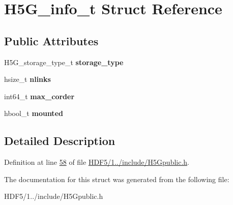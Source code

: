 \hypertarget{struct_h5_g__info__t}{}\section{H5\+G\+\_\+info\+\_\+t Struct Reference}
\label{struct_h5_g__info__t}
\subsection*{Public Attributes}
\begin{DoxyCompactItemize}
\item 
\mbox{\label{struct_h5_g__info__t_a1e48d909c66c0da1e3ce9a9c5885d88e}} 
H5\+G\+\_\+storage\+\_\+type\+\_\+t {\bfseries storage\+\_\+type}
\item 
\mbox{\label{struct_h5_g__info__t_a59f61c76e38e6fec7d0aa7eec27d1c12}} 
hsize\+\_\+t {\bfseries nlinks}
\item 
\mbox{\label{struct_h5_g__info__t_a868324af84add9487ea453082f1bfdbb}} 
int64\+\_\+t {\bfseries max\+\_\+corder}
\item 
\mbox{\label{struct_h5_g__info__t_a0dd8dd06b20dc3af0a481d725feaf4fe}} 
hbool\+\_\+t {\bfseries mounted}
\end{DoxyCompactItemize}


\subsection{Detailed Description}


Definition at line \hyperlink{_h_d_f5_21_810_81_2include_2_h5_gpublic_8h_source_l00058}{58} of file \hyperlink{_h_d_f5_21_810_81_2include_2_h5_gpublic_8h_source}{H\+D\+F5/1../include/\+H5\+Gpublic.\+h}.



The documentation for this struct was generated from the following file\+:\begin{DoxyCompactItemize}
\item 
H\+D\+F5/1../include/\+H5\+Gpublic.\+h\end{DoxyCompactItemize}
